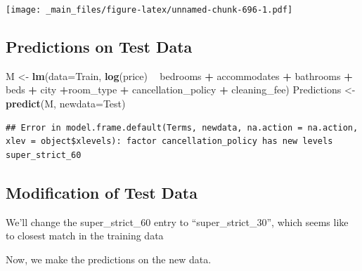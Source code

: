 \documentclass[]{book}
\newenvironment{Shaded}{\begin{snugshade}}{\end{snugshade}}
\newcommand{\KeywordTok}[1]{\textcolor[rgb]{0.13,0.29,0.53}{\textbf{#1}}}
\newcommand{\DataTypeTok}[1]{\textcolor[rgb]{0.13,0.29,0.53}{#1}}
\newcommand{\StringTok}[1]{\textcolor[rgb]{0.31,0.60,0.02}{#1}}
\newcommand{\OperatorTok}[1]{\textcolor[rgb]{0.81,0.36,0.00}{\textbf{#1}}}
\newcommand{\NormalTok}[1]{#1}
\begin{document}
\texttt{[image: \_main\_files/figure-latex/unnamed-chunk-696-1.pdf]}

\subsection{Predictions on Test Data}\label{predictions-on-test-data}

\begin{Shaded}
\begin{Highlighting}[]
\NormalTok{M <-}\StringTok{ }\KeywordTok{lm}\NormalTok{(}\DataTypeTok{data=}\NormalTok{Train, }\KeywordTok{log}\NormalTok{(price) }\OperatorTok{~}\StringTok{ }\NormalTok{bedrooms }\OperatorTok{+}\StringTok{ }\NormalTok{accommodates }\OperatorTok{+}\StringTok{ }\NormalTok{bathrooms }\OperatorTok{+}\StringTok{ }\NormalTok{beds }\OperatorTok{+}\StringTok{ }
\StringTok{           }\NormalTok{city }\OperatorTok{+}\NormalTok{room_type }\OperatorTok{+}\StringTok{ }\NormalTok{cancellation_policy }\OperatorTok{+}\StringTok{ }\NormalTok{cleaning_fee)}
\NormalTok{Predictions <-}\StringTok{ }\KeywordTok{predict}\NormalTok{(M, }\DataTypeTok{newdata=}\NormalTok{Test)}
\end{Highlighting}
\end{Shaded}

\begin{verbatim}
## Error in model.frame.default(Terms, newdata, na.action = na.action, xlev = object$xlevels): factor cancellation_policy has new levels super_strict_60
\end{verbatim}

\subsection{Modification of Test Data}\label{modification-of-test-data}

We'll change the super\_strict\_60 entry to ``super\_strict\_30'', which
seems like to closest match in the training data

\begin{Shaded}
\end{Shaded}

Now, we make the predictions on the new data.
\end{document}
